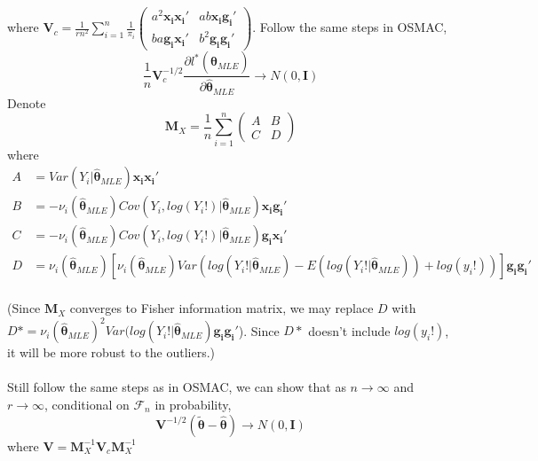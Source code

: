 \documentclass[]{article}
\begin{document}
where $\boldsymbol{V}_c = \frac{1}{rn^2}\sum_{i=1}^{n}\frac{1}{\pi_i}\begin{pmatrix}
	a^2\boldsymbol{x_i}\boldsymbol{x_i}' &
	ab\boldsymbol{x_i}\boldsymbol{g_i}'\\
	ba\boldsymbol{g_i}\boldsymbol{x_i}' &
	b^2\boldsymbol{g_i}\boldsymbol{g_i}'
\end{pmatrix}$.
Follow the same steps in OSMAC, 
$$
\frac{1}{n}\boldsymbol{V}_c^{-1/2}\frac{\partial l^*(\hat{\boldsymbol{\theta}}_{MLE})}{\partial\hat{\boldsymbol{\theta}}_{MLE}} \to N(0, \boldsymbol{I})
$$
Denote
$$
\boldsymbol{M}_X = \frac{1}{n}\sum_{i=1}^{n}\begin{pmatrix}
	A & B\\
	C & D
\end{pmatrix}
$$
where
\begin{align*}
	A &= Var(Y_i|\hat{\boldsymbol{\theta}}_{MLE})\boldsymbol{x_i}\boldsymbol{x_i}'\\
	B &= -\nu_i(\hat{\boldsymbol{\theta}}_{MLE}) Cov(Y_i, log(Y_i!)| \hat{\boldsymbol{\theta}}_{MLE})\boldsymbol{x_i}\boldsymbol{g_i}'\\
	C &= -\nu_i(\hat{\boldsymbol{\theta}}_{MLE}) Cov(Y_i, log(Y_i!)|\hat{\boldsymbol{\theta}}_{MLE})\boldsymbol{g_i}\boldsymbol{x_i}'\\
	D &= \nu_i(\hat{\boldsymbol{\theta}}_{MLE})[\nu_i(\hat{\boldsymbol{\theta}}_{MLE}) Var(log(Y_i!|\hat{\boldsymbol{\theta}}_{MLE}) - E(log(Y_i!|\hat{\boldsymbol{\theta}}_{MLE})) + log(y_i!))]\boldsymbol{g_i}\boldsymbol{g_i}'
\end{align*}
\\
(Since $\boldsymbol{M}_X$ converges to Fisher information matrix, we may replace $D$ with $D* = \nu_i(\hat{\boldsymbol{\theta}}_{MLE})^2Var(log(Y_i!|\hat{\boldsymbol{\theta}}_{MLE})\boldsymbol{g_i}\boldsymbol{g_i}'$). Since $D*$ doesn't include $log(y_i!)$, it will be more robust to the outliers.)\\
\\
Still follow the same steps as in OSMAC, we can show that as $n \to \infty$ and $r \to \infty$, conditional on $\mathcal{F}_n$ in probability,
$$
\boldsymbol{V}^{-1/2}(\tilde{\boldsymbol{\theta}} - \hat{\boldsymbol{\theta}}) \to N(0, \boldsymbol{I})
$$
where $\boldsymbol{V} = \boldsymbol{M}_X^{-1}\boldsymbol{V}_c\boldsymbol{M}_X^{-1}$
\\
\end{document}
